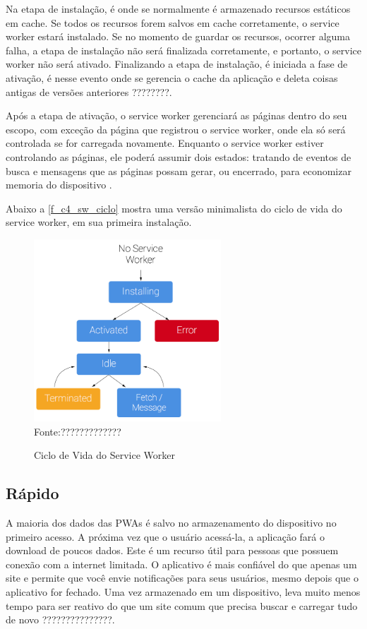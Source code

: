 Na etapa de instalação, é onde se normalmente é armazenado recursos estáticos em cache. Se todos os recursos forem salvos em cache corretamente, o service worker estará instalado. Se no momento de guardar os recursos, ocorrer alguma falha, a etapa de instalação não será finalizada corretamente, e portanto, o service worker não será ativado. Finalizando a etapa de instalação, é iniciada a fase de ativação, é nesse evento onde se gerencia o cache da aplicação e deleta coisas antigas de versões anteriores \cite{servicework} ????????.

Após a etapa de ativação, o service worker gerenciará as páginas dentro do seu escopo, com exceção da página que registrou o service worker, onde ela só será controlada se for carregada novamente. Enquanto o service worker estiver controlando as páginas, ele poderá assumir dois estados: tratando de eventos de busca e mensagens que as páginas possam gerar, ou encerrado, para economizar memoria do dispositivo \cite{servicework}.


Abaixo 	a \autoref{f_c4_sw_ciclo} mostra uma versão minimalista do ciclo de vida do service worker, em sua primeira instalação.
\newpage
\begin{figure}[!htpb]
	\centering
	\caption{Ciclo de Vida do Service Worker}
	\includegraphics[width=7cm]{images/sw-lifecycle.png}\\
	Fonte:?????????????
 	\label{f_c4_sw_ciclo}
\end{figure}

\subsection{Rápido}
A maioria dos dados das \ac{PWA}s é salvo no armazenamento do dispositivo no primeiro acesso. A próxima vez que o usuário acessá-la, a aplicação fará o download de poucos dados. Este é um recurso útil para pessoas que possuem conexão com a internet limitada. O aplicativo é mais confiável do que apenas um site e permite que você envie notificações para seus usuários, mesmo depois que o aplicativo for fechado. Uma vez armazenado em um dispositivo, leva muito menos tempo para ser reativo do que um site comum que precisa buscar e carregar tudo de novo ???????????????.

